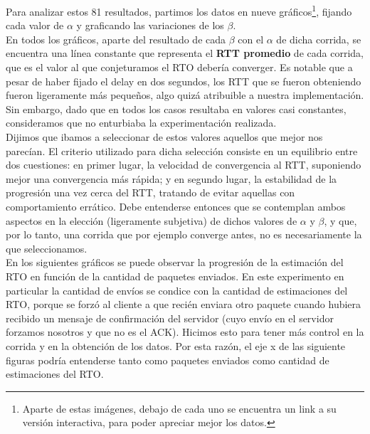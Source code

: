 \indent Para analizar estos 81 resultados, partimos los datos en nueve gráficos\footnote{Aparte de estas imágenes, debajo de cada uno se encuentra un link a su versión interactiva, para poder apreciar mejor los datos.}, fijando cada valor de $\alpha$ y graficando las variaciones de los $\beta$.\\

\indent En todos los gráficos, aparte del resultado de cada $\beta$ con el $\alpha$ de dicha corrida, se encuentra una línea constante que representa el \textbf{RTT promedio} de cada corrida, que es el valor al que conjeturamos el RTO debería converger. Es notable que a pesar de haber fijado el delay en dos segundos, los RTT que se fueron obteniendo fueron ligeramente más pequeños, algo quizá atribuible a nuestra implementación. Sin embargo, dado que en todos los casos resultaba en valores casi constantes, consideramos que no enturbiaba la experimentación realizada.\\

\indent Dijimos que ibamos a seleccionar de estos valores aquellos que mejor nos parecían. El criterio utilizado para dicha selección consiste en un equilibrio entre dos cuestiones: en primer lugar, la velocidad de convergencia al RTT, suponiendo mejor una convergencia más rápida; y en segundo lugar, la estabilidad de la progresión una vez cerca del RTT, tratando de evitar aquellas con comportamiento errático. Debe entenderse entonces que se contemplan ambos aspectos en la elección (ligeramente subjetiva) de dichos valores de $\alpha$ y $\beta$, y que, por lo tanto, una corrida que por ejemplo converge antes, no es necesariamente la que seleccionamos.\\

\indent En los siguientes gráficos se puede observar la progresión de la estimación del RTO en función de la cantidad de paquetes enviados. En este experimento en particular la cantidad de envíos se condice con la cantidad de estimaciones del RTO, porque se forzó al cliente a que recién enviara otro paquete cuando hubiera recibido un mensaje de confirmación del servidor (cuyo envío en el servidor forzamos nosotros y que no es el ACK). Hicimos esto para tener más control en la corrida y en la obtención de los datos. Por esta razón, el eje x de las siguiente figuras podría entenderse tanto como paquetes enviados como cantidad de estimaciones del RTO.\\

